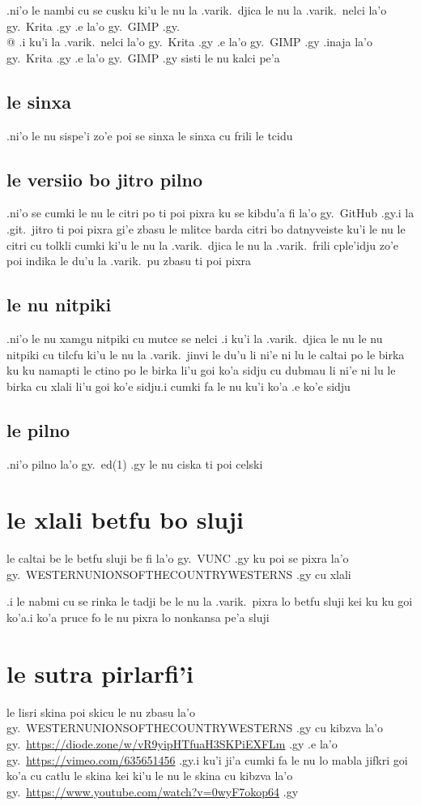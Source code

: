 \documentclass{report}
\begin{document}
.ni'o le nambi cu se cusku ki'u le nu la .varik.\ djica le nu la .varik.\ nelci la'o gy.\ Krita .gy .e la'o gy.\ GIMP .gy.\\@  .i ku'i la .varik.\ nelci la'o gy.\ Krita .gy .e la'o gy.\ GIMP .gy .inaja la'o gy.\ Krita .gy .e la'o gy.\ GIMP .gy sisti le nu kalci pe'a

\subsection{le sinxa}
.ni'o le nu sispe'i zo'e poi se sinxa le sinxa cu frili le tcidu

\subsection{le versiio bo jitro pilno}
.ni'o se cumki le nu le citri po ti poi pixra ku se kibdu'a fi la'o gy.\ GitHub .gy\@  .i la .git.\ jitro ti poi pixra gi'e zbasu le mlitce barda citri bo datnyveiste
ku'i le nu le citri cu tolkli cumki ki'u le nu la .varik.\ djica le nu la .varik.\ frili cple'idju zo'e poi indika le du'u la .varik.\ pu zbasu ti poi pixra

\subsection{le nu nitpiki}
.ni'o le nu xamgu nitpiki cu mutce se nelci  .i ku'i la .varik.\ djica le nu le nu nitpiki cu tilcfu ki'u le nu la .varik.\ jinvi le du'u li ni'e ni lu le caltai po le birka ku ku namapti le ctino po le birka li'u goi ko'a sidju cu dubmau li ni'e ni lu le birka cu xlali li'u goi ko'e sidju\@  .i cumki fa le nu ku'i ko'a .e ko'e sidju

\subsection{le pilno}
.ni'o pilno la'o gy.\ ed(1) .gy le nu ciska ti poi celski

\section{le xlali betfu bo sluji}
le caltai be le betfu sluji be fi la'o gy.\ VUNC .gy ku poi se pixra la'o gy.\ WESTERNUNIONSOFTHECOUNTRYWESTERNS .gy cu xlali

.i le nabmi cu se rinka le tadji be le nu la .varik.\ pixra lo betfu sluji kei ku ku goi ko'a\@  .i ko'a pruce fo le nu pixra lo nonkansa pe'a sluji

\section{le sutra pirlarfi'i}
le lisri skina poi skicu le nu zbasu la'o gy.\ WESTERNUNIONSOFTHECOUNTRYWESTERNS .gy cu kibzva la'o gy.\ \url{https://diode.zone/w/vR9yipHTfuaH3SKPiEXFLm} .gy .e la'o gy.\ \url{https://vimeo.com/635651456} .gy\@  .i ku'i ji'a cumki fa le nu lo mabla jifkri goi ko'a cu catlu le skina kei ki'u le nu le skina cu kibzva la'o gy.\ \url{https://www.youtube.com/watch?v=0wyF7okop64} .gy
\end{document}

